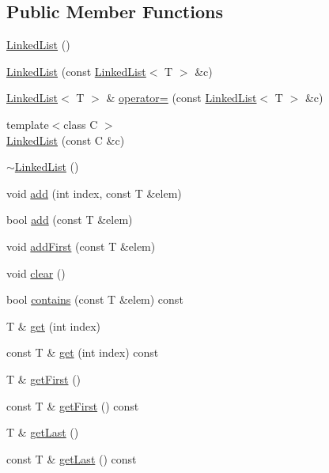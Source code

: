 \subsection*{Public Member Functions}
\begin{DoxyCompactItemize}
\item 
\hyperlink{class_linked_list_a3c20fcfec867e867f541061a09fc640c}{LinkedList} ()
\item 
\hyperlink{class_linked_list_a06c97ccd01573325f1bddf30e15e366c}{LinkedList} (const \hyperlink{class_linked_list}{LinkedList}$<$ T $>$ \&c)
\item 
\hyperlink{class_linked_list}{LinkedList}$<$ T $>$ \& \hyperlink{class_linked_list_a07ef021b97550ab6ed0f3a1d1ad7427d}{operator=} (const \hyperlink{class_linked_list}{LinkedList}$<$ T $>$ \&c)
\item 
{\footnotesize template$<$class C $>$ }\\\hyperlink{class_linked_list_a7e4c42f63cd8d0624fb8960f25d03e45}{LinkedList} (const C \&c)
\item 
\hyperlink{class_linked_list_a7c37609df3b83bc4eb0281b852f93fd7}{$\sim$LinkedList} ()
\item 
void \hyperlink{class_linked_list_ad0177c4910fb1aac2f0fffd06b471e58}{add} (int index, const T \&elem)
\item 
bool \hyperlink{class_linked_list_ac3efbdccf1679ad827ea10bef5898785}{add} (const T \&elem)
\item 
void \hyperlink{class_linked_list_af19a202520edaf4d33edff6f55daf996}{addFirst} (const T \&elem)
\item 
void \hyperlink{class_linked_list_a50c26292740c964ac7bef0e072868be1}{clear} ()
\item 
bool \hyperlink{class_linked_list_a2c4297c495231df567e0f0e303b91794}{contains} (const T \&elem) const 
\item 
T \& \hyperlink{class_linked_list_aa34d85df4f82f094ba9d6f4708519ebd}{get} (int index)
\item 
const T \& \hyperlink{class_linked_list_a78c5a8787f9470caf6338926ada07799}{get} (int index) const 
\item 
T \& \hyperlink{class_linked_list_ada8499b0f4f17bf69a30366efccae972}{getFirst} ()
\item 
const T \& \hyperlink{class_linked_list_af44b74adc8430722a39e3b6cc98bc6d1}{getFirst} () const 
\item 
T \& \hyperlink{class_linked_list_aefe930154ad592cc18c78136bdf07413}{getLast} ()
\item 
const T \& \hyperlink{class_linked_list_a0db2a1d97087a713049ea00e94e613e1}{getLast} () const 

\end{DoxyCompactItemize}
